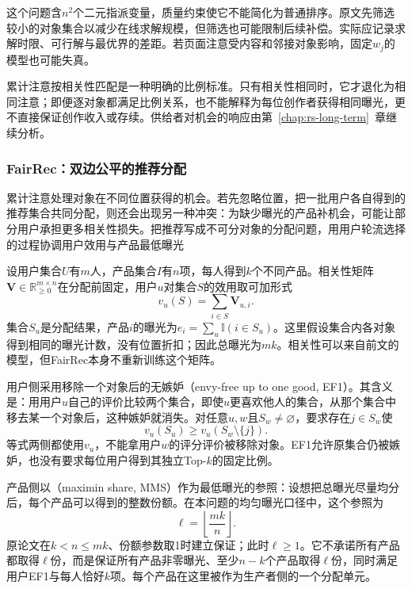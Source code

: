 这个问题含$n^2$个二元指派变量，质量约束使它不能简化为普通排序。原文先筛选较小的对象集合以减少在线求解规模，但筛选也可能限制后续补偿。实际应记录求解时限、可行解与最优界的差距。若页面注意受内容和邻接对象影响，固定$w_j$的模型也可能失真。

累计注意按相关性匹配是一种明确的比例标准。只有相关性相同时，它才退化为相同注意；即便逐对象都满足比例关系，也不能解释为每位创作者获得相同曝光，更不直接保证创作收入或存续。供给者对机会的响应由第~\ref{chap:rs-long-term}~章继续分析。

\subsubsection{FairRec：双边公平的推荐分配}
\label{sec:rs-fairrec}

累计注意处理对象在不同位置获得的机会。若先忽略位置，把一批用户各自得到的推荐集合共同分配，则还会出现另一种冲突：为缺少曝光的产品补机会，可能让部分用户承担更多相关性损失。把推荐写成不可分对象的分配问题，用用户轮流选择的过程协调用户效用与产品最低曝光

设用户集合$U$有$m$人，产品集合$I$有$n$项，每人得到$k$个不同产品。相关性矩阵$\bm{V}\in\mathbb{R}_{\geq0}^{m\times n}$在分配前固定，用户$u$对集合$S$的效用取可加形式
\[
 v_u(S)=\sum_{i\in S}\bm{V}_{u,i}.
\]
集合$S_u$是分配结果，产品$i$的曝光为$e_i=\sum_u\mathbb{I}(i\in S_u)$。这里假设集合内各对象得到相同的曝光计数，没有位置折扣；因此总曝光为$mk$。相关性可以来自前文的模型，但FairRec本身不重新训练这个矩阵。

用户侧采用移除一个对象后的无嫉妒（envy-free up to one good, EF1）。其含义是：用用户$u$自己的评价比较两个集合，即使$u$更喜欢他人的集合，从那个集合中移去某一个对象后，这种嫉妒就消失。对任意$u,w$且$S_w\ne\varnothing$，要求存在$j\in S_w$使
\begin{equation}
 v_u(S_u)\geq v_u(S_w\setminus\{j\}).
 \label{eq:rs-fairrec-ef1}
\end{equation}
等式两侧都使用$v_u$，不能拿用户$w$的评分评价被移除对象。EF1允许原集合仍被嫉妒，也没有要求每位用户得到其独立Top-$k$的固定比例。

产品侧以（maximin share, MMS）作为最低曝光的参照：设想把总曝光尽量均分后，每个产品可以得到的整数份额。在本问题的均匀曝光口径中，这个参照为
\[
 \ell=\left\lfloor\frac{mk}{n}\right\rfloor.
\]
原论文在$k<n\leq mk$、份额参数取1时建立保证；此时$\ell\geq1$。它不承诺所有产品都取得$\ell$份，而是保证所有产品非零曝光、至少$n-k$个产品取得$\ell$份，同时满足用户EF1与每人恰好$k$项。每个产品在这里被作为生产者侧的一个分配单元。

